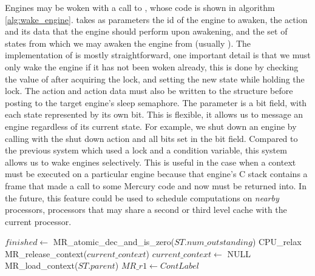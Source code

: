 Engines may be woken with a call to \wakeengine,
whose code is shown in algorithm \ref{alg:wake_engine}.
\wakeengine takes as parameters the id of the engine to awaken,
the action and its data that the engine should perform upon awakening,
and the set of states from which we may awaken the engine from (usually
).
The implementation of \wakeengine is mostly straightforward,
one important detail is that we must only wake the engine if it has not
been woken already, this is done by checking the value of
 after acquiring the lock,
and setting the new state while holding the lock.
The action and action data must also be written to the
\enginesleepsync structure before posting to the target engine's sleep
semaphore.
The parameter  is a bit field, with each state represented by
its own bit.
This is flexible, it allows us to message an engine regardless of its
current state.
For example,
we shut down an engine by calling \wakeengine with the shut down action and
all bits set in the  bit field.
Compared to the previous system which used a lock and a condition variable,
this system allows us to wake engines selectively.
This is useful in the case when a context must be executed on a particular
engine because that engine's C stack contains a frame that made a call to
some Mercury code and now must be returned into.
In the future, this feature could be used to schedule computations on
\emph{nearby} processors,
processors that may share a second or third level cache with the current
processor.

\begin{algorithm}[tbp]
\begin{algorithmic}[1]
  \State $finished \gets$ MR\_atomic\_dec\_and\_is\_zero($ST.num\_outstanding$)
        \State CPU\_relax
      \EndWhile
      \State MR\_release\_context($current\_context$)
      \State $current\_context \gets$ NULL
      \State MR\_load\_context($ST.parent$)
    \EndIf
  \Else
      \State $MR\_r1 \gets ContLabel$
    \Else
    \EndIf
  \EndIf
\EndProcedure
\end{algorithmic}
\caption{\joinandcontinue}
\label{alg:join_and_continue_ws2}
\end{algorithm}


